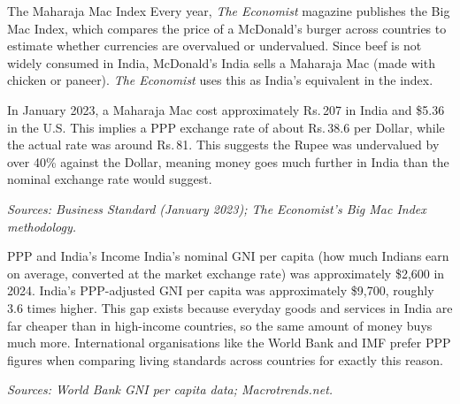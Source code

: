 \documentclass[12pt,a4paper]{article}
\begin{document}
\begin{didyouknow}{The Maharaja Mac Index}
Every year, \textit{The Economist} magazine publishes the Big Mac Index, which compares the price of a McDonald's burger across countries to estimate whether currencies are overvalued or undervalued. Since beef is not widely consumed in India, McDonald's India sells a Maharaja Mac (made with chicken or paneer). \textit{The Economist} uses this as India's equivalent in the index.

In January 2023, a Maharaja Mac cost approximately Rs.\,207 in India and \$5.36 in the U.S. This implies a PPP exchange rate of about Rs.\,38.6 per Dollar, while the actual rate was around Rs.\,81. This suggests the Rupee was undervalued by over 40\% against the Dollar, meaning money goes much further in India than the nominal exchange rate would suggest.

\smallskip
{\footnotesize \textit{Sources: Business Standard (January 2023); The Economist's Big Mac Index methodology.}}
\end{didyouknow}

\begin{didyouknow}{PPP and India's Income}
India's nominal GNI per capita (how much Indians earn on average, converted at the market exchange rate) was approximately \$2,600 in 2024. India's PPP-adjusted GNI per capita was approximately \$9,700, roughly 3.6 times higher. This gap exists because everyday goods and services in India are far cheaper than in high-income countries, so the same amount of money buys much more. International organisations like the World Bank and IMF prefer PPP figures when comparing living standards across countries for exactly this reason.

\smallskip
{\footnotesize \textit{Sources: World Bank GNI per capita data; Macrotrends.net.}}
\end{didyouknow}
\end{document}
